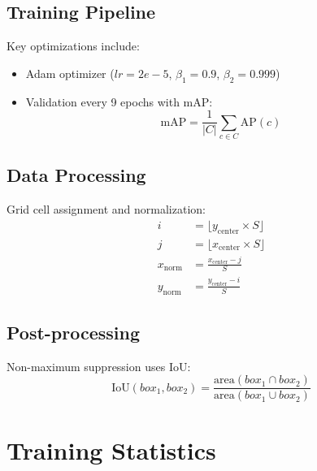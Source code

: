 \documentclass[conference]{IEEEtran}
\begin{document}
\subsection{Training Pipeline}
Key optimizations include:
\begin{itemize}
    \item Adam optimizer ($lr = 2e-5$, $\beta_1 = 0.9$, $\beta_2 = 0.999$)
    \item Validation every 9 epochs with mAP:
    \begin{equation}
    \text{mAP} = \frac{1}{|C|} \sum_{c \in C} \text{AP}(c)
    \end{equation}
\end{itemize}

\subsection{Data Processing}
Grid cell assignment and normalization:
\begin{equation}
\begin{aligned}
i &= \lfloor y_{\text{center}} \times S \rfloor \\
j &= \lfloor x_{\text{center}} \times S \rfloor \\
x_{\text{norm}} &= \frac{x_{\text{center}} - j}{S} \\
y_{\text{norm}} &= \frac{y_{\text{center}} - i}{S}
\end{aligned}
\end{equation}

\subsection{Post-processing}
Non-maximum suppression uses IoU:
\begin{equation}
\text{IoU}(box_1, box_2) = \frac{\text{area}(box_1 \cap box_2)}{\text{area}(box_1 \cup box_2)}
\end{equation}

\section{Training Statistics}
\end{document}
